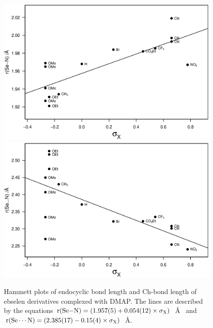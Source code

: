 \begin{refsection}
\begin{figure}
    \centering
    \includegraphics[width=0.9\linewidth]{Figures/hammett-endo-dmap.eps}
    \includegraphics[width=0.9\linewidth]{Figures/hammett-dmap.eps}
    \caption{Hammett plots of endocyclic  bond length and  Ch-bond length of ebselen derivatives complexed with DMAP. The lines are described by the equations $\mathrm{r}(\ce{Se-N}) = (1.957(5) + 0.054(12) \times \sigma_{\mathrm{X}})$~\AA~ and $\mathrm{r}(\ce{Se\cdots N}) = (2.385(17) - 0.15(4) \times \sigma_{\mathrm{X}})$~\AA.}
    \label{fig:hammett-dmap}
\end{figure}


\end{refsection}

